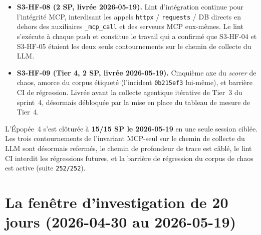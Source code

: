 \documentclass[11pt,a4paper,oneside]{report}
\begin{document}
\begin{itemize}
        Collecte de trace en profondeur via
        \texttt{get\_trace(trace\_id)} MCP. Le pipeline collectait
        auparavant les données Jaeger au niveau frontière de
        service uniquement et pouvait identifier \og~l'\emph{upstream}
        est lent~\fg{} mais ne pouvait pas nommer ce qui était
        lent. Avec la profondeur de trace, le LLM voit désormais
        les attributs par \emph{span} (\texttt{db.statement},
        \texttt{http.target}, étiquettes d'erreur) pour la trace
        défaillante. Pré-étape (exécutée pendant la fenêtre
        d'investigation)~: échantillonnage de 12 traces Spring Boot
        en direct pour confirmer la paramétrisation JDBC~; les
        \emph{spans} \texttt{db.statement} utilisent des paramètres
        liés (\texttt{?,\,?,\,?}), donc la redaction de PII n'a pas
        constitué un obstacle.
  \item \textbf{S3-HF-08 (2 SP, livrée 2026-05-19).} Lint
        d'intégration continue pour l'intégrité MCP, interdisant
        les appels \texttt{httpx} / \texttt{requests} / DB directs
        en dehors des auxiliaires \texttt{\_mcp\_call} et des
        serveurs MCP eux-mêmes. Le lint s'exécute à chaque push et
        constitue le travail qui a confirmé que S3-HF-04 et
        S3-HF-05 étaient les deux seuls contournements sur le
        chemin de collecte du LLM.
  \item \textbf{S3-HF-09 (Tier 4, 2 SP, livrée 2026-05-19).}
        Cinquième axe du \emph{scorer} de chaos, amorce du corpus
        étiqueté (l'incident \texttt{0b215ef3} lui-même), et
        barrière CI de régression. Livrée avant la collecte
        agentique itérative de Tier~3 du sprint~4, désormais
        débloquée par la mise en place du tableau de mesure de
        Tier~4.
\end{itemize}

L'Épopée~4 s'est clôturée à \textbf{15/15 SP le 2026-05-19} en une
seule session ciblée. Les trois contournements de l'invariant
MCP-seul sur le chemin de collecte du LLM sont désormais refermés,
le chemin de profondeur de trace est câblé, le lint CI interdit
les régressions futures, et la barrière de régression du corpus de
chaos est active (suite \texttt{252/252}).

\section{La fenêtre d'investigation de 20 jours (2026-04-30 au 2026-05-19)}
\label{sec:investigation}
\end{document}
